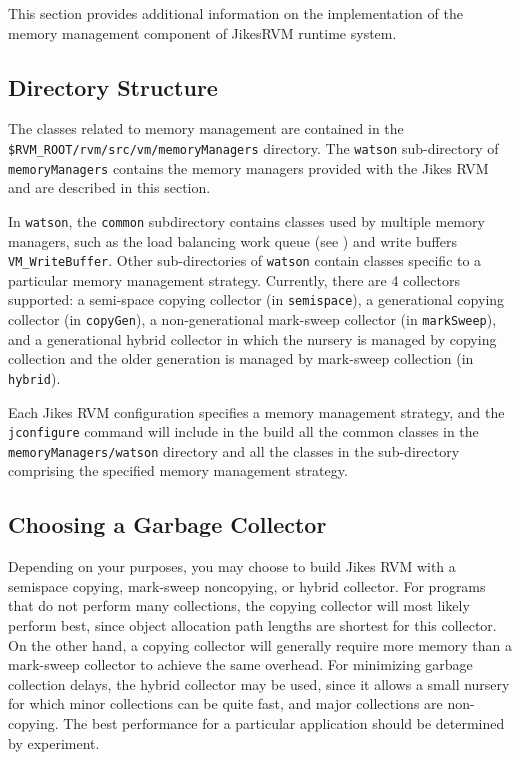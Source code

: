 This section provides additional information on the implementation
of the memory management component of Jikes\trademark RVM runtime system.

\subsection{Directory Structure} \label{sssec:directories}
The classes related to memory management are contained in the 
{\tt \$RVM\_ROOT/rvm/src/vm/memoryManagers}  directory.
The  {\tt watson}  sub-directory of  {\tt memoryManagers}  contains
the memory managers provided with the Jikes RVM
and are described in this section.  

In {\tt watson}, the {\tt common} subdirectory contains classes used by multiple
memory managers, such as the load balancing work queue
(see )
and write buffers {\tt VM\_WriteBuffer}.
Other sub-directories of {\tt watson} 
contain classes specific to a particular memory management strategy.
Currently, there are 4 collectors supported: 
a semi-space copying collector (in {\tt semispace}),
a generational copying collector (in {\tt copyGen}), 
a non-generational mark-sweep collector (in {\tt markSweep}), 
and a generational hybrid collector in which the nursery is managed by copying collection
and the older generation is managed by mark-sweep collection (in {\tt hybrid}).

Each Jikes RVM configuration specifies a memory management strategy, 
and the  {\tt jconfigure}   command will include in the build all the
common classes in the {\tt memoryManagers/watson} directory and 
all the classes in the sub-directory comprising the specified memory management strategy.

\subsection{Choosing a Garbage Collector} \label{ssec:choosinggc}
Depending on your purposes, you may choose to build Jikes RVM with a
semispace copying, mark-sweep noncopying, or hybrid collector.  For
programs that do not perform many collections, the copying collector
will most likely perform best, since object allocation path lengths
are shortest for this collector.  On the other hand, a copying
collector will generally require more memory than a mark-sweep
collector to achieve the same overhead. For minimizing garbage
collection delays, the hybrid collector may be used, since it allows a
small nursery for which minor collections can be quite fast, and major
collections are non-copying.  The best performance for a particular
application should be determined by experiment.

